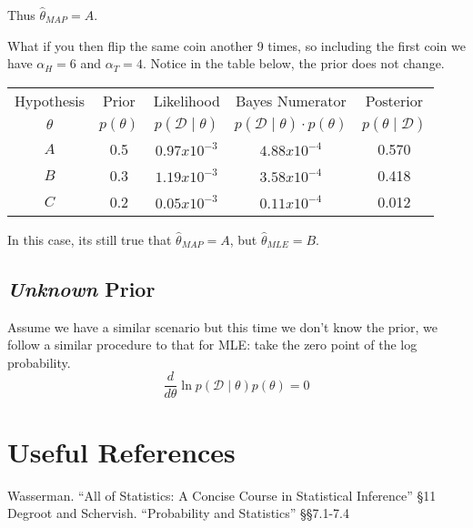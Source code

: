 Thus $\hat\theta_{MAP} = A$. 

What if you then flip the same coin another 9 times, so including the first coin we have 
$\alpha_H=6$ and $\alpha_T=4$.
Notice in the table below, the prior does not change. 

\begin{center}
\begin{tabular}{|c||c|c|c|c|}
\hline
Hypothesis & Prior & Likelihood & Bayes Numerator & Posterior\\
$\theta$ & $p(\theta)$ & $p(\mathcal{D}\mid\theta)$ & $p(\mathcal{D}\mid\theta)\cdot p(\theta)$ & $p(\theta\mid\mathcal{D})$\\
\hline
\hline
$A$	& 0.5		& $0.97x10^{-3}$ & $4.88x10^{-4}$	& 0.570\\
$B$	& 0.3		& $1.19x10^{-3}$ & $3.58x10^{-4}$	& 0.418\\
$C$	& 0.2		& $0.05x10^{-3}$ & $0.11x10^{-4}$	& 0.012\\
\hline
\end{tabular}
\end{center}

In this case, its still true that $\hat\theta_{MAP} = A$,
but $\hat\theta_{MLE} = B$. 


\subsection{\textit{Unknown} Prior}
Assume we have a similar scenario but this time we don't know the prior, 
we follow a similar procedure to that for MLE: 
take the zero point of the log probability. 
\[\frac{d}{d\theta} \ln p(\mathcal{D}\mid\theta)p(\theta) = 0\]

\section*{Useful References}
Wasserman. ``All of Statistics: A Concise Course in Statistical Inference'' \S11
Degroot and Schervish. ``Probability and Statistics''  \S\S7.1-7.4


